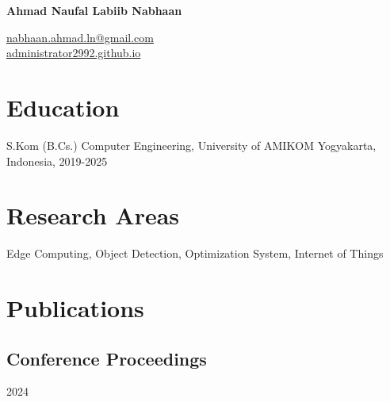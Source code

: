 \documentclass[12pt,letterpaper]{report}
\newcommand{\myname}{Ahmad Naufal Labiib Nabhaan}
\newcommand{\namefont}[1]{{\normalfont\bfseries\Huge{#1}}}
\newcommand{\listitemspace}{0.25em}
\renewenvironment{itemize}
{\begin{list}{}{\setlength{\leftmargin}{0em}
                \setlength{\parskip}{0em}
                \setlength{\itemsep}{\listitemspace}
                \setlength{\parsep}{\listitemspace}}}
{\end{list}}
\begin{document}
    \raggedright{}

    \namefont{\myname}

    \vspace{1em}
    \begin{minipage}[t]{0.700\textwidth}
        \href{mailto:nabhaan.ahmad.ln@gmail.com}{nabhaan.ahmad.ln@gmail.com} \\
        \href{https://administrator2992.github.io}{administrator2992.github.io}
    \end{minipage}

    \section*{Education}

    \begin{tablist}
        \item[S.Kom (B.Cs.)] \tab{}Computer Engineering, University of AMIKOM Yogyakarta, Indonesia, 2019-2025 \\
    \end{tablist}
    
    \section*{Research Areas}
    \begin{itemize}
        \item Edge Computing, Object Detection, Optimization System, Internet of Things
    \end{itemize}
    
    \section*{Publications}

    \subsection*{Conference Proceedings}
    \begin{tablist}
        \item[2024] \tab{}
    \end{tablist}
\end{document}
